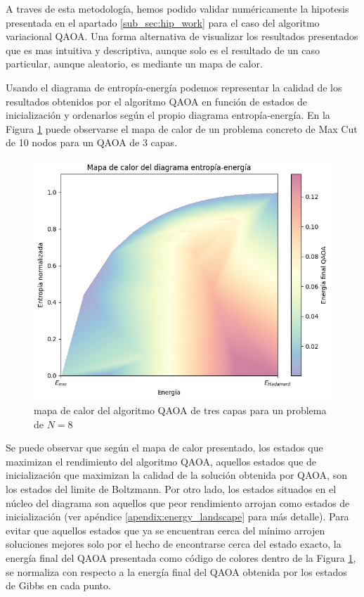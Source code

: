 A traves de esta metodología, hemos podido validar numéricamente la hipotesis presentada en el apartado \ref{sub_sec:hip_work} para el caso del algoritmo variacional QAOA. Una forma alternativa de visualizar los resultados presentados que es mas intuitiva y descriptiva, aunque solo es el resultado de un caso particular, aunque aleatorio, es mediante un mapa de calor. 

\newpage

Usando el diagrama de entropía-energía podemos representar la calidad de los resultados obtenidos por el algoritmo QAOA en función de estados de inicialización y ordenarlos según el propio diagrama entropía-energía. En la Figura \ref{fig:mapa_calor} puede observarse el mapa de calor de un problema concreto de Max Cut de 10 nodos para un QAOA de 3 capas.


\begin{figure}[!h]
    \centering
    \includegraphics[scale = 0.8]{plt/06-mapa_calor.png}
    \caption{mapa de calor del algoritmo QAOA de tres capas para un problema de $N=8$}
    \label{fig:mapa_calor}
\end{figure}

Se puede observar que según el mapa de calor presentado, los estados que maximizan el rendimiento del algoritmo QAOA, aquellos estados que de inicialización que maximizan la calidad de la solución obtenida por QAOA, son los estados del limite de Boltzmann. Por otro lado, los estados situados en el núcleo del diagrama son aquellos que peor rendimiento arrojan como estados de inicialización (ver apéndice \ref{apendix:energy_landscape}  para más detalle). Para evitar que aquellos estados que ya se encuentran cerca del mínimo arrojen soluciones mejores solo por el hecho de encontrarse cerca del estado exacto, la energía final del QAOA presentada como código de colores dentro de la Figura \ref{fig:mapa_calor}, se normaliza con respecto a la energía final del QAOA obtenida por los estados de Gibbs en cada punto.

